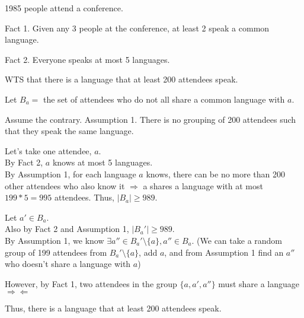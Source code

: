 \documentclass[fleqn]{article}
\begin{document}
1985 people attend a conference.

Fact 1. Given any 3 people at the conference, 
at least 2 speak a common language.

Fact 2. Everyone speaks at most 5 languages.

WTS that there is a language that at least 200 attendees speak.

Let $B_a = $ the set of attendees who do not all share a common language with $a$.

Assume the contrary. 
Assumption 1. There is no grouping of 200 attendees such that they speak the same language.

Let's take one attendee, $a$.\\
By Fact 2, $a$ knows at most 5 languages.\\
By Assumption 1, for each language $a$ knows, there can be no more than 200 other attendees who also know it $\Rightarrow$ a shares a language with at most $199*5=995$ attendees. Thus, $|B_a| \geq 989$.

Let $a' \in B_a$.\\
Also by Fact 2 and Assumption 1, $|B_a'| \geq 989$.\\
By Assumption 1, we know 
$\exists a'' \in B_a' \setminus \lbrace a \rbrace, a'' \in B_a$.
(We can take a random group of 199 attendees from $B_a' \setminus \lbrace a \rbrace$, add $a$, and from Assumption 1 find an $a''$ who doesn't share a language with $a$)

However, by Fact 1, two attendees in the group 
$\lbrace a, a', a'' \rbrace$ must share a language 
$\Rightarrow \Leftarrow$

Thus, there is a language that at least 200 attendees speak.
\end{document}
